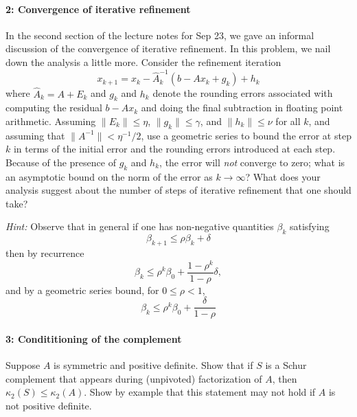 \documentclass[12pt, leqno]{article} %
\begin{document}
\paragraph*{2: Convergence of iterative refinement}
In the second section of the lecture notes for Sep 23, we gave an
informal discussion of the convergence of iterative refinement.  In
this problem, we nail down the analysis a little more.  Consider the
refinement iteration
\[
  x_{k+1} = x_k - \hat{A}_k^{-1} (b - A x_k + g_k) + h_k
\]
where $\hat{A}_k = A + E_k$ and $g_k$ and $h_k$ denote the rounding
errors associated with computing the residual $b-Ax_k$ and doing the
final subtraction in floating point arithmetic.  Assuming $\|E_k\|
\leq \eta$, $\|g_k\| \leq \gamma$, and $\|h_k\| \leq \nu$ for all $k$,
and assuming that $\|A^{-1}\| < \eta^{-1}/2$, use a geometric series to
bound the error at step $k$ in terms of the initial error and the
rounding errors introduced at each step.  Because of the presence of
$g_k$ and $h_k$, the error will {\em not} converge to zero; what is an
asymptotic bound on the norm of the error as $k \rightarrow \infty$?
What does your analysis suggest about the number of steps of iterative
refinement that one should take?

{\em Hint:}  Observe that in general if one has non-negative
quantities $\beta_k$ satisfying
\[
  \beta_{k+1} \leq \rho \beta_k + \delta
\]
then by recurrence
\[
  \beta_k
  \leq \rho^k \beta_0 + \frac{1-\rho^k}{1-\rho} \delta,
\]
and by a geometric series bound, for $0 \leq \rho < 1$,
\[
  \beta_k \leq \rho^k \beta_0 + \frac{\delta}{1-\rho}
\]

\paragraph*{3: Condititioning of the complement}
Suppose $A$ is symmetric and positive definite.  Show that if $S$ is a
Schur complement that appears during (unpivoted) factorization of $A$, then
$\kappa_2(S) \leq \kappa_2(A)$.  Show by example that this statement
may not hold if $A$ is not positive definite.
\end{document}
